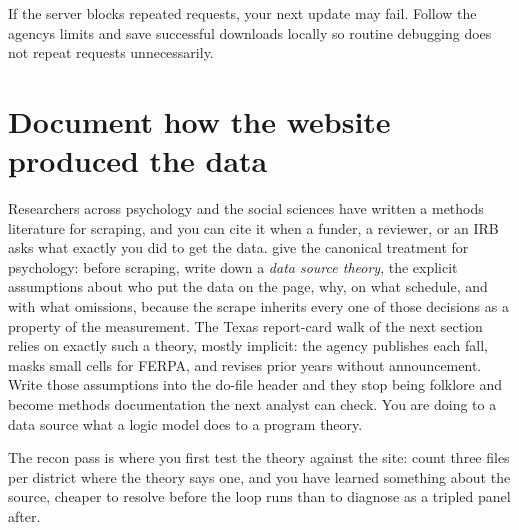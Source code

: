 \documentclass[
    a4paper,
    fontsize=10pt,
    twoside=true,
    numbers=noenddot,
]{kaobook}
\begin{document}
If the server blocks repeated requests, your next update may fail. Follow the agency\textquotesingle s limits and save successful downloads locally so routine debugging does not repeat requests unnecessarily.

\section{Document how the website produced the data}\label{sec:ch04-scrapelit}
Researchers across psychology and the social sciences have written a methods literature for scraping, and you can cite it when a funder, a reviewer, or an IRB asks what exactly you did to get the data. \textcite{landers2016scraping} give the canonical treatment for psychology: before scraping, write down a \emph{data source theory}, the explicit assumptions about who put the data on the page, why, on what schedule, and with what omissions, because the scrape inherits every one of those decisions as a property of the measurement. The Texas report-card walk of the next section relies on exactly such a theory, mostly implicit: the agency publishes each fall, masks small cells for FERPA, and revises prior years without announcement. Write those assumptions into the do-file header and they stop being folklore and become methods documentation the next analyst can check. You are doing to a data source what a logic model does to a program theory.

The recon pass is where you first test the theory against the site: count three files per district where the theory says one, and you have learned something about the source, cheaper to resolve before the loop runs than to diagnose as a tripled panel after.
\end{document}
